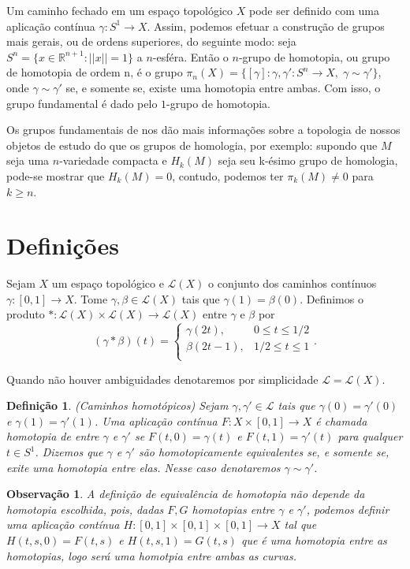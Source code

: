 \documentclass[12pt]{book}
\newtheorem{definicao}[teorema]{Definição}
\newtheorem{observacao}[teorema]{Observação}
\newcommand{\caminhos}{\mathcal{L}}
\newcommand{\caminhossempontobase}[1]{\caminhos(#1)}
\newcommand{\circulo}{S^{1}}
\newcommand{\classe}[1]{[#1]}
\newcommand{\funcaocond}[5]{
	#1 = 
	\left\{
	\begin{array}{cc}
		#2, & #3\\
		#4, & #5\\
	\end{array}
	\right.
}
\newcommand{\homologia}[2]{H_{#1}(#2)}
\newcommand{\norma}[1]{||#1||}
\newcommand{\real}[1]{\mathbb{R}^{#1}}
\begin{document}
	Um caminho fechado em um espaço topológico $X$ pode ser definido com uma aplicação contínua $\gamma:\circulo\to X$. Assim, podemos efetuar a construção de grupos mais gerais, ou de ordens superiores, do seguinte modo: seja $S^{n}= \{x \in \real{n+1}: \norma{x}=1\}$ a $n$-esféra. Então o $n$-grupo de homotopia, ou grupo de homotopia de ordem n, é o grupo $\pi_{n}(X) = \{\classe{\gamma}: \gamma,\gamma':S^{n}\to X,\; \gamma \sim \gamma'\}$, onde $\gamma \sim \gamma'$ se, e somente se, existe uma homotopia entre ambas. Com isso, o grupo fundamental é dado pelo $1$-grupo de homotopia.
	
	Os grupos fundamentais de nos dão mais informações sobre a topologia de nossos objetos de estudo do que os grupos de homologia, por exemplo: supondo que $M$ seja uma $n$-variedade compacta e $H_{k}(M)$ seja seu k-ésimo grupo de homologia, pode-se mostrar que $\homologia{k}{M} = 0$, contudo, podemos ter $\pi_{k}(M)\neq 0$ para $k\geq n$.
	
	\section{Definições}
	
	Sejam $X$ um espaço topológico e $\caminhossempontobase{X}$ o conjunto dos caminhos contínuos $\gamma:[0,1]\to X$. Tome $\gamma, \beta \in \caminhossempontobase{X}$ tais que $\gamma(1) = \beta(0)$. Definimos o produto $*:\caminhossempontobase{X}\times \caminhossempontobase{X} \to \caminhossempontobase{X}$ entre $\gamma$ e $\beta$ por
	$$
	\funcaocond{(\gamma*\beta)(t)}{\gamma(2t)}{0\leq t \leq 1/2}{\beta(2t-1)}{1/2 \leq t \leq 1}.
	$$
	
	Quando não houver ambiguidades denotaremos por simplicidade $\caminhos=\caminhossempontobase{X}$.
	
	\begin{definicao}\label{definicao_caminhos_homotopicos}
		(Caminhos homotópicos) Sejam $\gamma, \gamma' \in \caminhos$ tais que $\gamma(0)=\gamma'(0)$ e $\gamma(1)=\gamma'(1)$. Uma aplicação contínua $F:X \times [0,1] \to X$ é chamada homotopia de entre $\gamma$ e $\gamma'$ se $F(t, 0) = \gamma(t)$ e $F(t, 1) = \gamma'(t)$ para qualquer $t\in \circulo$. Dizemos que  $\gamma$ e $\gamma'$ são homotopicamente equivalentes se, e somente se, exite uma homotopia entre elas. Nesse caso denotaremos $\gamma \sim \gamma'$. 
	\end{definicao}
	
	\begin{observacao}
		A definição de equivalência de homotopia não depende da homotopia escolhida, pois, dadas $F,G$ homotopias entre $\gamma$ e $\gamma'$, podemos definir uma aplicação contínua $H: [0,1] \times [0,1] \times [0,1] \to X$ tal que $H(t,s ,0) = F(t,s)$ e $H(t,s, 1) = G(t,s)$ que é uma homotopia entre as homotopias, logo será uma homotpia entre ambas as curvas.
	\end{observacao}
	
\end{document}
